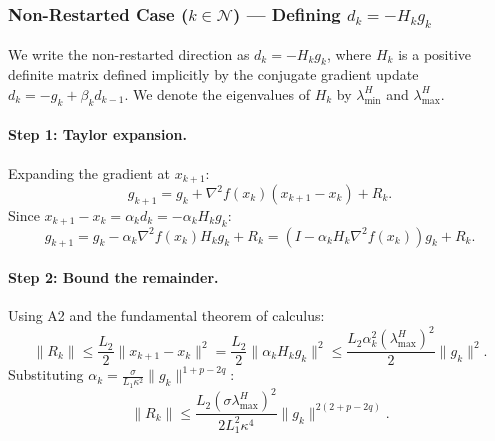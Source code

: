 \documentclass{article}
\begin{document}
\subsubsection{Non-Restarted Case ($k \in \mathcal{N}$) — Defining $d_k = -H_k g_k$}

We write the non-restarted direction as $d_k = -H_k g_k$, where $H_k$ is a positive definite matrix defined implicitly by the conjugate gradient update $d_k = -g_k + \beta_k d_{k-1}$. We denote the eigenvalues of $H_k$ by $\lambda_{\min}^H$ and $\lambda_{\max}^H$.

\paragraph{Step 1: Taylor expansion.} Expanding the gradient at $x_{k+1}$:
\[
g_{k+1} = g_k + \nabla^2 f(x_k)(x_{k+1} - x_k) + R_k.
\]
Since $x_{k+1} - x_k = \alpha_k d_k = -\alpha_k H_k g_k$:
\[
g_{k+1} = g_k - \alpha_k \nabla^2 f(x_k) H_k g_k + R_k = \left(I - \alpha_k H_k \nabla^2 f(x_k)\right)g_k + R_k.
\]

\paragraph{Step 2: Bound the remainder.} Using A2 and the fundamental theorem of calculus:
\[
\|R_k\| \leq \frac{L_2}{2}\|x_{k+1} - x_k\|^2 = \frac{L_2}{2}\|\alpha_k H_k g_k\|^2 \leq \frac{L_2\alpha_k^2(\lambda_{\max}^H)^2}{2}\|g_k\|^2.
\]
Substituting $\alpha_k = \frac{\sigma}{L_1\kappa^2}\|g_k\|^{1+p-2q}$:
\begin{equation}
\label{eq:Rk_NR}
\|R_k\| \leq \frac{L_2(\sigma\lambda_{\max}^H)^2}{2L_1^2\kappa^4}\|g_k\|^{2(2+p-2q)}.
\end{equation}
\end{document}

